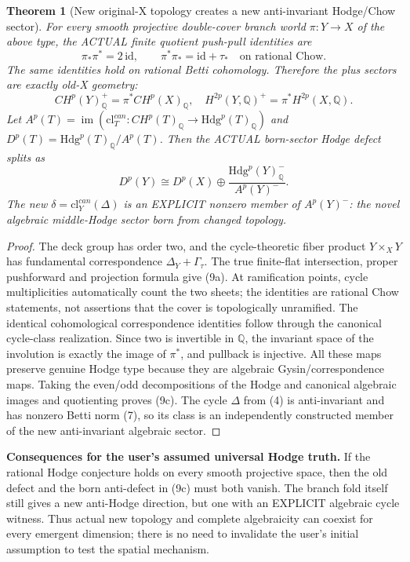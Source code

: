\documentclass[11pt]{article}
\newcommand{\Q}{\mathbb Q}
\newcommand{\cl}{\mathrm{cl}}
\newcommand{\Hdg}{\mathrm{Hdg}}
\newtheorem{theorem}{Theorem}
\begin{document}
\begin{theorem}[New original-X topology creates a new anti-invariant Hodge/Chow sector]
For every
smooth
projective
double-cover
branch world
\(\pi:Y\to X\)
of the above
type,
the ACTUAL
finite quotient
push-pull
identities are
\[
 \boxed{
 \pi_*\pi^*=2\,\mathrm{id},
 \qquad
 \pi^*\pi_*=
       \mathrm{id}+\tau_*
       \quad\text{on rational Chow.}
 }                                                        \tag{9a}
\]
The same
identities
hold on
rational Betti
cohomology.
Therefore
the plus
sectors are
exactly
old-X
geometry:
\[
 \boxed{
  CH^p(Y)_\Q^+
       =\pi^*CH^p(X)_\Q,\quad
  H^{2p}(Y,\Q)^+
       =\pi^*H^{2p}(X,\Q).
 }                                                        \tag{9b}
\]
Let
\(
 A^p(T)
  =\operatorname{im}(
   \cl_T^{can}:CH^p(T)_\Q
       \to\Hdg^p(T)_\Q)
\)
and
\(
 D^p(T)=\Hdg^p(T)_\Q/A^p(T)
\).
Then the
ACTUAL
born-sector
Hodge defect
splits as
\[
 \boxed{
 D^p(Y)\cong
   D^p(X)\oplus
   \frac{\Hdg^p(Y)_\Q^-}
        {A^p(Y)^-}.
 }                                                        \tag{9c}
\]
The new
\(\delta=\cl_Y^{can}(\Delta)\)
is an
EXPLICIT
nonzero member
of
\(A^p(Y)^-\):
the novel
algebraic
middle-Hodge
sector born
from changed
topology.
\end{theorem}
\begin{proof}
The deck
group has
order two,
and the
cycle-theoretic
fiber product
\(Y\times_XY\)
has
fundamental
correspondence
\(\Delta_Y+\Gamma_\tau\).
The true
finite-flat
intersection,
proper
pushforward
and
projection
formula
give (9a).
At
ramification
points,
cycle
multiplicities
automatically
count the
two sheets;
the identities
are rational
Chow statements,
not assertions
that the
cover is
topologically
unramified.
The identical
cohomological
correspondence
identities
follow through
the canonical
cycle-class
realization.
Since two
is invertible
in \(\Q\),
the invariant
space of the
involution is
exactly the
image of
\(\pi^*\),
and pullback
is injective.
All these
maps preserve
genuine Hodge
type because
they are
algebraic
Gysin/correspondence
maps.
Taking the
even/odd
decompositions
of the
Hodge and
canonical
algebraic
images and
quotienting
proves (9c).
The cycle
\(\Delta\)
from (4)
is anti-invariant
and has
nonzero
Betti norm
(7), so its
class is
an
independently
constructed
member of
the new
anti-invariant
algebraic
sector.
\end{proof}

\noindent\textbf{Consequences for the user's assumed universal Hodge truth.}
If the rational
Hodge conjecture
holds on every
smooth
projective
space,
then the
old defect
and
the born
anti-defect
in (9c)
must both
vanish.
The branch
fold itself
still gives
a new
anti-Hodge
direction,
but one
with an
EXPLICIT
algebraic
cycle witness.
Thus actual
new topology
and complete
algebraicity
can coexist
for every
emergent
dimension;
there is no
need to
invalidate
the user's
initial
assumption
to test the
spatial
mechanism.
\end{document}
